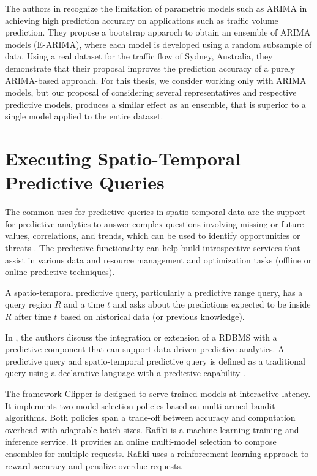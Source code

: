 The authors in \cite{Shahriari2020} recognize the limitation of parametric models such as ARIMA in achieving high prediction accuracy on applications such as traffic volume prediction. They propose a bootstrap apparoch to obtain an ensemble of ARIMA models (E-ARIMA), where each model is developed using a random subsample of data. Using a real dataset for the traffic flow of Sydney, Australia, they demonstrate that their proposal improves the prediction accuracy of a purely ARIMA-based approach. For this thesis, we consider working only with ARIMA models, but our proposal of considering several representatives and respective predictive models, produces a similar effect as an ensemble, that is superior to a single model applied to the entire dataset.

\section{Executing Spatio-Temporal Predictive Queries}
\label{Sec:RelatedWorksQueries}

The common uses for predictive queries in spatio-temporal data are the support for predictive analytics to answer complex questions involving missing or future values, correlations, and trends, which can be used to identify opportunities or threats \cite{}. The predictive functionality can help build introspective services that assist in various data and resource management and optimization tasks (offline or online predictive techniques).

A spatio-temporal predictive query, particularly a predictive range query, has a query region $R$ and a time $t$ and asks about the predictions expected to be inside $R$ after time $t$ based on historical data (or previous knowledge). 

In \cite{Akdere2011}, the authors discuss the integration or extension of a RDBMS with a predictive component that can support data-driven predictive analytics. A predictive query and spatio-temporal predictive query is defined as a traditional query using a declarative language with a predictive capability \cite{Hendawi2012}. 

The framework Clipper \cite{Crankshaw2017} is designed to serve trained models at interactive latency. It implements two model selection policies based on multi-armed bandit algorithms. Both policies span a trade-off between accuracy and computation overhead with adaptable batch sizes. Rafiki \cite{Wang2018} is a machine learning training and inference service. It provides an online multi-model selection to compose ensembles for multiple requests. Rafiki uses a reinforcement learning approach to reward accuracy and penalize overdue requests. 

